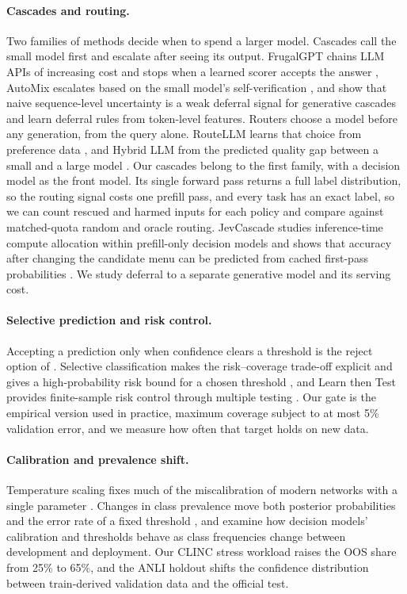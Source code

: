 \documentclass[11pt]{article}
\begin{document}
\paragraph{Cascades and routing.}
Two families of methods decide when to spend a larger model. Cascades call the small model first and escalate after seeing its output. FrugalGPT chains LLM APIs of increasing cost and stops when a learned scorer accepts the answer \citep{chen2023frugalgpt}, AutoMix escalates based on the small model's self-verification \citep{aggarwal2024automix}, and \citet{gupta2024cascades} show that naive sequence-level uncertainty is a weak deferral signal for generative cascades and learn deferral rules from token-level features. Routers choose a model before any generation, from the query alone. RouteLLM learns that choice from preference data \citep{ong2024routellm}, and Hybrid LLM from the predicted quality gap between a small and a large model \citep{ding2024hybrid}. Our cascades belong to the first family, with a decision model as the front model. Its single forward pass returns a full label distribution, so the routing signal costs one prefill pass, and every task has an exact label, so we can count rescued and harmed inputs for each policy and compare against matched-quota random and oracle routing. JevCascade studies inference-time compute allocation within prefill-only decision models and shows that accuracy after changing the candidate menu can be predicted from cached first-pass probabilities \citep{li2026jevcascade}. We study deferral to a separate generative model and its serving cost.

\paragraph{Selective prediction and risk control.}
Accepting a prediction only when confidence clears a threshold is the reject option of \citet{chow1970optimum}. Selective classification makes the risk--coverage trade-off explicit and gives a high-probability risk bound for a chosen threshold \citep{geifman2017selective}, and Learn then Test provides finite-sample risk control through multiple testing \citep{angelopoulos2021ltt}. Our gate is the empirical version used in practice, maximum coverage subject to at most 5\% validation error, and we measure how often that target holds on new data.

\paragraph{Calibration and prevalence shift.}
Temperature scaling fixes much of the miscalibration of modern networks with a single parameter \citep{guo2017calibration}. Changes in class prevalence move both posterior probabilities and the error rate of a fixed threshold \citep{saerens2002adjusting,lipton2018detecting}, and \citet{iqbal2026typed} examine how decision models' calibration and thresholds behave as class frequencies change between development and deployment. Our CLINC stress workload raises the OOS share from 25\% to 65\%, and the ANLI holdout shifts the confidence distribution between train-derived validation data and the official test.
\end{document}
